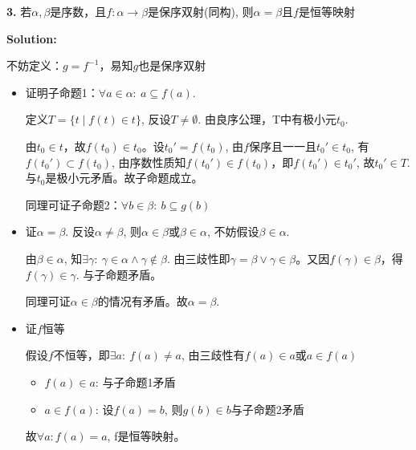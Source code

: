 \documentclass[UTF8, 9pt, a4paper]{ctexart}
\newcommand{\ksec}[2]{\noindent \textbf{\large #1} #2\par}
\newcommand{\ksolve}{\noindent\textbf{\large Solution: }\par}
\begin{document}
	\begin{comment}
	$ \overset{=}{A} \leq \overset{=}{B} $: if 存在A到B的单射。
	有穷的情况下必然正确，若两集合数量不一样，总有一边无法达成满射。
	无穷：f映满B中所有元素，去掉重复映射，仅保留一个, 得到$ f':A' \rightarrow B $。g映满A中所有元素s，同理处理，得到$ g':B' \rightarrow A $. 显然：$ |B| = |B'| = |A| = |A'| $, 且$ g'\ f' $都是双射。
	单且满为双。
	\end{comment}	
	
	\vspace{0.5cm}
	
	\ksec{3. }{若$ \alpha, \beta $是序数，且$ f: \alpha \rightarrow \beta $是保序双射(同构), 则$ \alpha = \beta $且$ f $是恒等映射}
	
	\ksolve
	不妨定义：$ g = f^{-1} $，易知$ g $也是保序双射
	\begin{itemize}
		\item 证明子命题1：$ \forall a \in \alpha:\ a \subseteq f(a) $.\par
		
		定义$ T = \{ t \mid f(t) \in t \} $, 反设$ T \neq \emptyset $. 由良序公理，T中有极小元$ t_0 $. \par
		
		由$t_0 \in t$，故$ f(t_0) \in t_0 $。设$ t_0' = f(t_0) $, 由$ f $保序且一一且$ t_0' \in t_0 $, 有$ f(t_0') \subset f(t_0) $, 由序数性质知$ f(t_0') \in f(t_0) $，即$ f(t_0') \in t_0' $, 故$ t_0' \in T $. 与$ t_0 $是极小元矛盾。故子命题成立。\par
		同理可证子命题2：$ \forall b \in \beta:\ b \subseteq g(b)  $
		
		
		\item 证$ \alpha = \beta $. 反设$ \alpha \neq \beta $, 则$ \alpha \in \beta $或$ \beta \in \alpha $, 不妨假设$ \beta \in \alpha $.\par
		由$ \beta \in \alpha $, 知$ \exists \gamma:\ \gamma\in \alpha \land \gamma \notin \beta $. 由三歧性即$ \gamma = \beta \lor \gamma \in \beta $。又因$ f(\gamma) \in \beta $，得$ f(\gamma) \in \gamma $. 与子命题矛盾。\par
		同理可证$ \alpha \in \beta $的情况有矛盾。故$ \alpha = \beta $.
		
		\item 证$ f $恒等\par
		假设$ f $不恒等，即$ \exists a:\ f(a) \neq a $, 由三歧性有$ f(a) \in a $或$ a \in f(a) $
		\begin{itemize}
			\item $ f(a) \in a $: 与子命题1矛盾
			\item $ a \in f(a) $: 设$ f(a) = b $, 则$ g(b) \in b $与子命题2矛盾
		\end{itemize}
		故$ \forall a: f(a) = a $, f是恒等映射。
	\end{itemize}
	
\end{document}
